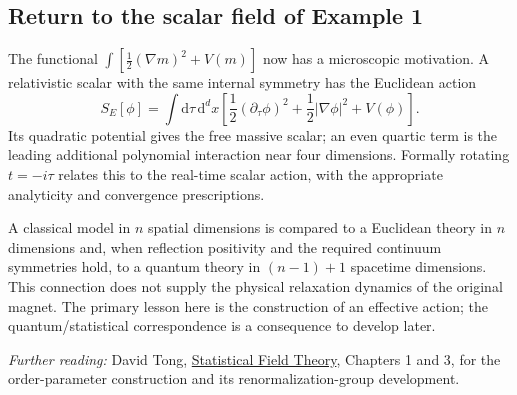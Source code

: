 \documentclass[11pt]{article}
\newcommand{\dd}{\mathrm{d}}
\begin{document}
\subsection{Return to the scalar field of Example 1}

The functional \(\int[\tfrac12(\nabla m)^2+V(m)]\) now has a microscopic
motivation. A relativistic scalar with the same internal symmetry has the
Euclidean action
\begin{equation}
S_E[\phi]=\int\dd\tau\,\dd^d x\left[
\frac12(\partial_\tau\phi)^2+\frac12|\nabla\phi|^2+V(\phi)\right].
\end{equation}
Its quadratic potential gives the free massive scalar; an even quartic term
is the leading additional polynomial interaction near four dimensions.
Formally rotating \(t=-i\tau\) relates this to the real-time scalar action,
with the appropriate analyticity and convergence prescriptions.

A classical model in \(n\) spatial dimensions is compared to a Euclidean
theory in \(n\) dimensions and, when reflection positivity and the required
continuum symmetries hold, to a quantum theory in \((n-1)+1\) spacetime
dimensions. This connection does not supply the physical relaxation dynamics
of the original magnet. The primary lesson here is the construction of an
effective action; the quantum/statistical correspondence is a consequence
to develop later.

\smallskip
\noindent\textit{Further reading:} David Tong,
\href{https://www.damtp.cam.ac.uk/user/tong/sft/}{Statistical Field Theory},
Chapters 1 and 3, for the order-parameter construction and its
renormalization-group development.

\end{document}
